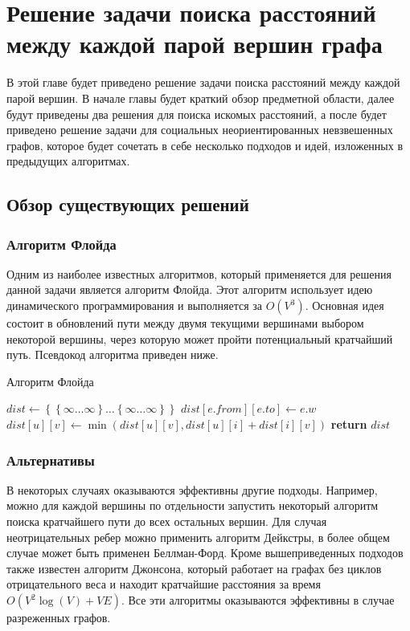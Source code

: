 \chapter{Решение задачи поиска расстояний между каждой парой вершин графа}

В этой главе будет приведено решение задачи поиска расстояний между каждой парой вершин. В начале главы будет краткий обзор предметной области, далее будут приведены два решения для поиска искомых расстояний, а после будет приведено решение задачи для социальных неориентированных невзвешенных графов, которое будет сочетать в себе несколько подходов и идей, изложенных в предыдущих алгоритмах. 

\FloatBarrier
\section{Обзор существующих решений}

\subsection{Алгоритм Флойда}
Одним из наиболее известных алгоритмов, который применяется для решения данной задачи является алгоритм Флойда. Этот алгоритм использует идею динамического программирования и выполняется за $O(V^3)$. Основная идея состоит в обновлений пути между двумя текущими вершинами выбором некоторой вершины, через которую может пройти потенциальный кратчайший путь. Псевдокод алгоритма приведен ниже. 

\FloatBarrier
\begin{algorithm}
\caption{Алгоритм Флойда}\label{floyd}
\begin{algorithmic}[1]
\State $dist\gets \left\{ {   \left\{ {\infty \ldots \infty}\right\}  \ldots \left\{ {\infty \ldots \infty}\right\} }\right\}$
	\State $dist[e.from][e.to] \gets e.w$
\EndFor 
\State
{}
			\State $dist[u][v] \gets \min(dist[u][v], dist[u][i] + dist[i][v])$
		\EndFor
	\EndFor
\EndFor
\State \textbf{return} $dist$
\EndProcedure
\end{algorithmic}
\end{algorithm}

\FloatBarrier
\subsection{Альтернативы}
В некоторых случаях оказываются эффективны другие подходы. Например, можно для каждой вершины по отдельности запустить некоторый алгоритм поиска кратчайшего пути до всех остальных вершин. Для случая неотрицательных ребер можно применить алгоритм Дейкстры, в более общем случае может быть применен Беллман-Форд. Кроме вышеприведенных подходов также известен алгоритм Джонсона, который работает на графах без циклов отрицательного веса и находит кратчайшие расстояния за время $O(V^2 \log(V) + VE)$. Все эти алгоритмы оказываются эффективны в случае разреженных графов.

